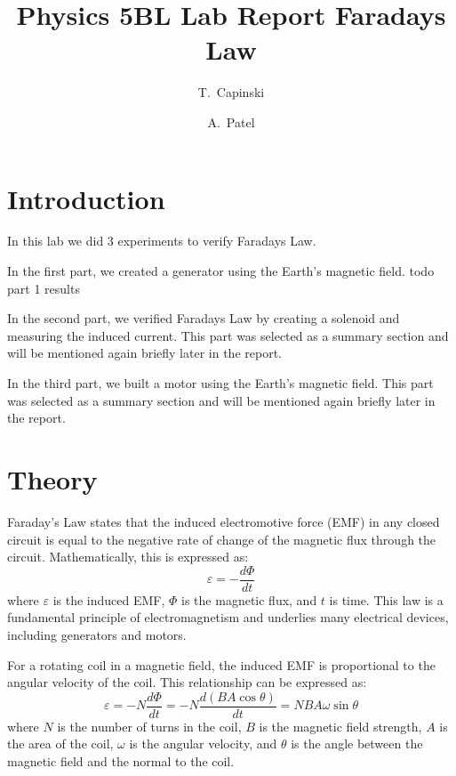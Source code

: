 \documentclass[11pt]{article}
\title{Physics 5BL Lab Report Faradays Law}
\author{T.~Capinski \and A.~Patel}
\let\oldsection\section
\renewcommand\section{\clearpage\oldsection}
\begin{document}
    \maketitle
    \tableofcontents

    \section*{Introduction}\label{sec:introduction}

    In this lab we did 3 experiments to verify Faradays Law. 
    
    In the first part, we created a generator using the Earth's magnetic field. todo part 1 results
    
    In the second part, we verified Faradays Law by creating a solenoid and measuring the induced current. This part was selected as a summary section and will be mentioned again briefly later in the report.
    
    In the third part, we built a motor using the Earth's magnetic field. This part was selected as a summary section and will be mentioned again briefly later in the report.


    \section*{Theory}\label{sec:theory}

    Faraday's Law states that the induced electromotive force (EMF) in any closed circuit is equal to the negative rate of change of the magnetic flux through the circuit.
    Mathematically, this is expressed as:
    \begin{equation}
        \varepsilon = -\frac{d\Phi}{dt}
        \label{eq:faraday}
    \end{equation}
    where $\varepsilon$ is the induced EMF, $\Phi$ is the magnetic flux, and $t$ is time.
    This law is a fundamental principle of electromagnetism and underlies many electrical devices, including generators and motors.

    For a rotating coil in a magnetic field, the induced EMF is proportional to the angular velocity of the coil.
    This relationship can be expressed as:
    \begin{equation}
        \varepsilon = -N\frac{d\Phi}{dt} = -N\frac{d(BA\cos\theta)}{dt} = NBA\omega\sin\theta
        \label{eq:rotating_coil}
    \end{equation}
    where $N$ is the number of turns in the coil, $B$ is the magnetic field strength, $A$ is the area of the coil, $\omega$ is the angular velocity, and $\theta$ is the angle between the magnetic field and the normal to the coil.
\end{document}
